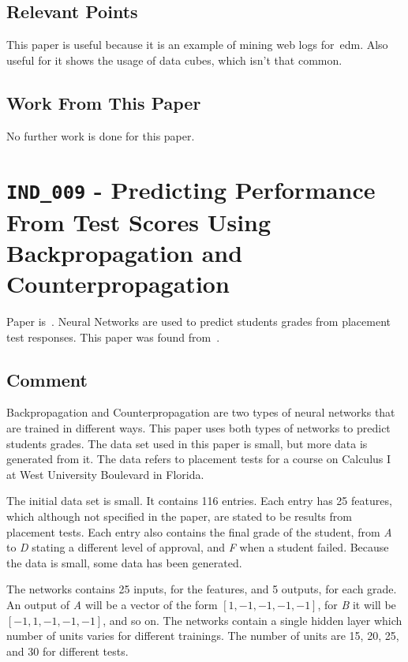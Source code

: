 \subsection{Relevant Points}

This paper is useful because it is an example of mining web logs for~\gls{edm}.
Also useful for it shows the usage of data cubes, which isn't that common.

\subsection{Work From This Paper}

No further work is done for this paper.

\section{\texttt{IND\_009} - Predicting Performance From Test Scores Using
Backpropagation and Counterpropagation}

Paper is~\cite{ind_009}. Neural Networks are used to predict students grades
from placement test responses. This paper was found from~\cite{ind_007}.

\subsection{Comment}

Backpropagation and Counterpropagation are two types of neural networks that
are trained in different ways. This paper uses both types of networks to
predict students grades. The data set used in this paper is small, but more
data is generated from it. The data refers to placement tests for a course on
Calculus I at West University Boulevard in Florida.

The initial data set is small. It contains 116 entries. Each entry has 25
features, which although not specified in the paper, are stated to be results
from placement tests. Each entry also contains the final grade of the student,
from \textit{A} to \textit{D} stating a different level of approval, and
\textit{F} when a student failed. Because the data is small, some data has been
generated.

The networks contains 25 inputs, for the features, and 5 outputs, for each
grade. An output of \textit{A} will be a vector of the form $ [1, -1, -1, -1,
-1] $, for \textit{B} it will be $ [-1, 1, -1, -1, -1] $, and so on. The
networks contain a single hidden layer which number of units varies for
different trainings. The number of units are 15, 20, 25, and 30 for different
tests.

